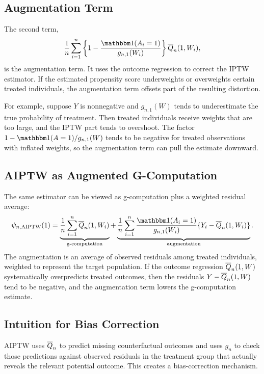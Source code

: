 \subsection{Augmentation Term}

The second term,
\[
\frac{1}{n}\sum_{i=1}^n
\left\{
1-\frac{\ind(A_i=1)}{g_{n,1}(W_i)}
\right\}
\Qbar_n(1,W_i),
\]
is the augmentation term. It uses the outcome regression to correct the IPTW
estimator. If the estimated propensity score underweights or overweights certain
treated individuals, the augmentation term offsets part of the resulting distortion.

For example, suppose $Y$ is nonnegative and $g_{n,1}(W)$ tends to underestimate the
true probability of treatment. Then treated individuals receive weights that are too
large, and the IPTW part tends to overshoot. The factor
$1-\ind(A=1)/g_{n,1}(W)$ tends to be negative for treated observations with inflated
weights, so the augmentation term can pull the estimate downward.

\subsection{AIPTW as Augmented G-Computation}

The same estimator can be viewed as g-computation plus a weighted residual average:
\[
\psi_{n,\AIPTW}(1)
=
\underbrace{
\frac{1}{n}\sum_{i=1}^n \Qbar_n(1,W_i)
}_{\text{g-computation}}
+
\underbrace{
\frac{1}{n}\sum_{i=1}^n
\frac{\ind(A_i=1)}{g_{n,1}(W_i)}
\{Y_i-\Qbar_n(1,W_i)\}
}_{\text{augmentation}}.
\]
The augmentation is an average of observed residuals among treated individuals,
weighted to represent the target population. If the outcome regression
$\overline{Q}_n(1,W)$ systematically overpredicts treated outcomes, then the residuals
$Y-\overline{Q}_n(1,W)$ tend to be negative, and the augmentation term lowers the
g-computation estimate.

\subsection{Intuition for Bias Correction}

AIPTW uses $\overline{Q}_n$ to predict missing counterfactual outcomes and uses $g_n$ to
check those predictions against observed residuals in the treatment group that
actually reveals the relevant potential outcome. This creates a bias-correction
mechanism.

